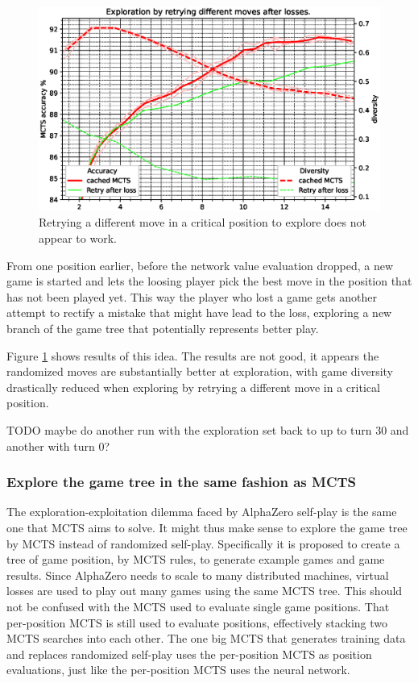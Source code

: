 \documentclass[12pt,onecolumn,oneside,titlepage]{article}
\begin{document}
\begin{figure}[H]
\centering
\includegraphics[clip,width=\columnwidth]{winp_tree}
\caption{Retrying a different move  in a critical position to explore does not appear to work.}
\label{fig:winp_tree}
\end{figure}

From one position earlier, before the network value evaluation dropped, a new game is started and lets the loosing player pick the best move in the position that has not been played yet.
This way the player who lost a game gets another attempt to rectify a mistake that might have lead to the loss, exploring a new branch of the game tree that potentially represents better play.


Figure \ref{fig:winp_tree} shows results of this idea. The results are not good, it appears the randomized moves are substantially better at exploration, with game diversity drastically reduced when exploring by retrying a different move in a critical position.



TODO maybe do another run with the exploration set back to up to turn 30 and another with turn 0?

\subsubsection{Explore the game tree in the same fashion as MCTS}

The exploration-exploitation dilemma faced by AlphaZero self-play is the same one that MCTS aims to solve. It might thus make sense to explore the game tree by MCTS instead of randomized self-play.
Specifically it is proposed to create a tree of game position, by MCTS rules, to generate example games and game results. Since AlphaZero needs to scale to many distributed machines, virtual losses \cite{chaslot2008parallel} are used to play out many games 
using the same MCTS tree. This should not be confused with the MCTS used to evaluate single game positions. That per-position MCTS is still used to evaluate positions, effectively stacking two MCTS searches into each other. The one big MCTS that generates training data
and replaces randomized self-play uses the per-position MCTS as position evaluations, just like the per-position MCTS uses the neural network.
\end{document}
